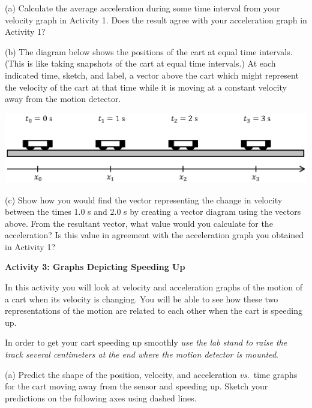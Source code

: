 (a) Calculate the average acceleration during some time interval from your velocity graph in Activity 1.  Does the result agree with your acceleration graph in Activity 1?
\answerspace{20mm}

(b) The diagram below shows the positions of the cart at equal time intervals.
(This is like taking snapshots of the cart at equal time intervals.) At each
indicated time, sketch, and label, a vector above the cart which might represent the velocity
of the cart at that time while it is moving at a constant velocity away from
the motion detector.

{\par\centering \includegraphics{changing/carts_const_v.eps} \par}

(c) Show how you would find the vector representing the change in velocity
between the times 1.0 s and 2.0 s by creating a vector diagram using the 
vectors above. From the resultant vector, what value would you calculate for 
the acceleration? Is this value in agreement
with the acceleration graph you obtained in Activity 1?
\answerspace{20mm}

\pagebreak[2]
\textbf{Activity 3: Graphs Depicting Speeding Up} 

In this activity you will look at velocity and acceleration graphs of the
motion of a cart when its velocity is changing. You will be able to see how
these two representations of the motion are related to each other when the cart
is speeding up.

In order to get your cart speeding up smoothly \textit{use the lab stand to raise the
track several centimeters at the end where the motion detector is mounted}.

(a) Predict the shape of the position, velocity, and acceleration \textit{vs.}~time graphs
for the cart moving away from the sensor and speeding up. Sketch your predictions
on the following axes using dashed lines.

